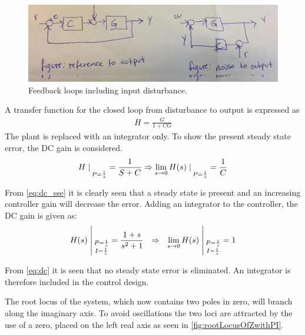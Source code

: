\begin{figure}[H]
	\centering
	\includegraphics[width=.6\textwidth]{figures/inputdisturbance.png}
	\caption{Feedback loops including input disturbance.}
	\label{fig:rootLocusOfZwithPI}
\end{figure}
A transfer function for the closed loop from disturbance to output is expressed as
\begin{align}
H=\frac{G}{1+CG}
\end{align}  
The plant is replaced with an integrator only. To show the present steady state error, the DC gain is considered.
\begin{align}
H\oleStreg{P=\frac{1}{s}}=\frac{1}{S+C} \Rightarrow \lim_{s \to 0} H(s)\oleStreg{P=\frac{1}{s}}= \frac{1}{C} \label{eq:dc_sse}
\end{align}
\begin{where}
\end{where}
From \autoref{eq:dc_sse} it is clearly seen that a steady state is present and an increasing controller gain will decrease the error.
Adding an integrator to the controller, the DC gain is given as:
\begin{align}
H(s)\oleStregTwo{P=\frac{1}{s}}{I=\frac{1}{s}} =\frac{1+s}{s^2+1} \ \ \Rightarrow\ \  \lim_{s \to 0} H(s)\oleStregTwo{P=\frac{1}{s}}{I=\frac{1}{s}} = 1 \label{eq:dc}
\end{align}
\begin{where}
\end{where}
From \autoref{eq:dc} it is seen that no steady state error is eliminated. 
An integrator is therefore included in the control design. 

The root locus of the system, which now contains two poles in zero, will branch along the imaginary axis. To avoid oscillations the two loci are attracted by the use of a zero, placed on the left real axis as seen in \autoref{fig:rootLocusOfZwithPI}.

